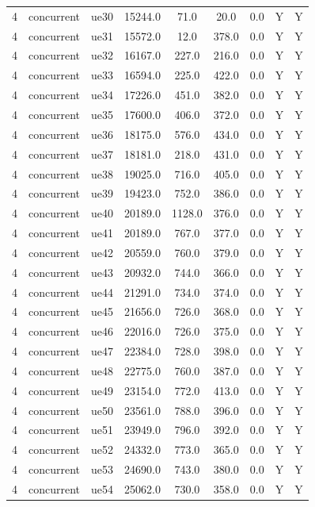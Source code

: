 \begin{table}[ht]
\begin{tabular}{|c|c|c|c|c|c|c|c|c|}
4 & concurrent & ue30 & 15244.0 & 71.0 & 20.0 & 0.0 & Y & Y \\
4 & concurrent & ue31 & 15572.0 & 12.0 & 378.0 & 0.0 & Y & Y \\
4 & concurrent & ue32 & 16167.0 & 227.0 & 216.0 & 0.0 & Y & Y \\
4 & concurrent & ue33 & 16594.0 & 225.0 & 422.0 & 0.0 & Y & Y \\
4 & concurrent & ue34 & 17226.0 & 451.0 & 382.0 & 0.0 & Y & Y \\
4 & concurrent & ue35 & 17600.0 & 406.0 & 372.0 & 0.0 & Y & Y \\
4 & concurrent & ue36 & 18175.0 & 576.0 & 434.0 & 0.0 & Y & Y \\
4 & concurrent & ue37 & 18181.0 & 218.0 & 431.0 & 0.0 & Y & Y \\
4 & concurrent & ue38 & 19025.0 & 716.0 & 405.0 & 0.0 & Y & Y \\
4 & concurrent & ue39 & 19423.0 & 752.0 & 386.0 & 0.0 & Y & Y \\
4 & concurrent & ue40 & 20189.0 & 1128.0 & 376.0 & 0.0 & Y & Y \\
4 & concurrent & ue41 & 20189.0 & 767.0 & 377.0 & 0.0 & Y & Y \\
4 & concurrent & ue42 & 20559.0 & 760.0 & 379.0 & 0.0 & Y & Y \\
4 & concurrent & ue43 & 20932.0 & 744.0 & 366.0 & 0.0 & Y & Y \\
4 & concurrent & ue44 & 21291.0 & 734.0 & 374.0 & 0.0 & Y & Y \\
4 & concurrent & ue45 & 21656.0 & 726.0 & 368.0 & 0.0 & Y & Y \\
4 & concurrent & ue46 & 22016.0 & 726.0 & 375.0 & 0.0 & Y & Y \\
4 & concurrent & ue47 & 22384.0 & 728.0 & 398.0 & 0.0 & Y & Y \\
4 & concurrent & ue48 & 22775.0 & 760.0 & 387.0 & 0.0 & Y & Y \\
4 & concurrent & ue49 & 23154.0 & 772.0 & 413.0 & 0.0 & Y & Y \\
4 & concurrent & ue50 & 23561.0 & 788.0 & 396.0 & 0.0 & Y & Y \\
4 & concurrent & ue51 & 23949.0 & 796.0 & 392.0 & 0.0 & Y & Y \\
4 & concurrent & ue52 & 24332.0 & 773.0 & 365.0 & 0.0 & Y & Y \\
4 & concurrent & ue53 & 24690.0 & 743.0 & 380.0 & 0.0 & Y & Y \\
4 & concurrent & ue54 & 25062.0 & 730.0 & 358.0 & 0.0 & Y & Y \\

\end{tabular}
\end{table}
